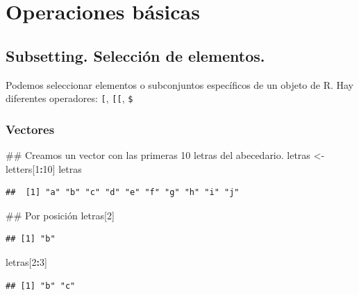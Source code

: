 \documentclass[spanish,]{book}
\newenvironment{Shaded}{\begin{snugshade}}{\end{snugshade}}
\newcommand{\DecValTok}[1]{\textcolor[rgb]{0.00,0.00,0.81}{#1}}
\newcommand{\StringTok}[1]{\textcolor[rgb]{0.31,0.60,0.02}{#1}}
\newcommand{\OperatorTok}[1]{\textcolor[rgb]{0.81,0.36,0.00}{\textbf{#1}}}
\newcommand{\NormalTok}[1]{#1}
\begin{document}
\chapter{Operaciones básicas}\label{operaciones-basicas}

\section{Subsetting. Selección de
elementos.}\label{subsetting.-seleccion-de-elementos.}

Podemos seleccionar elementos o subconjuntos específicos de un objeto de
R. Hay diferentes operadores: \texttt{{[}}, \texttt{{[}{[}}, \texttt{\$}

\subsection{Vectores}\label{vectores-1}

\begin{Shaded}
\begin{Highlighting}[]
\NormalTok{## Creamos un vector con las primeras 10 letras del abecedario.}
\NormalTok{letras <-}\StringTok{ }\NormalTok{letters[}\DecValTok{1}\OperatorTok{:}\DecValTok{10}\NormalTok{]}
\NormalTok{letras}
\end{Highlighting}
\end{Shaded}

\begin{verbatim}
##  [1] "a" "b" "c" "d" "e" "f" "g" "h" "i" "j"
\end{verbatim}

\begin{Shaded}
\begin{Highlighting}[]
\NormalTok{## Por posición}
\NormalTok{letras[}\DecValTok{2}\NormalTok{]}
\end{Highlighting}
\end{Shaded}

\begin{verbatim}
## [1] "b"
\end{verbatim}

\begin{Shaded}
\begin{Highlighting}[]
\NormalTok{letras[}\DecValTok{2}\OperatorTok{:}\DecValTok{3}\NormalTok{]}
\end{Highlighting}
\end{Shaded}

\begin{verbatim}
## [1] "b" "c"
\end{verbatim}
\end{document}
